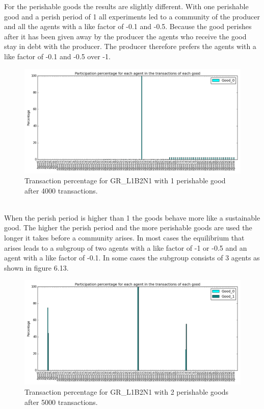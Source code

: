 \documentclass[twoside,openright]{uva-bachelor-thesis}
\begin{document}
For the perishable goods the results are slightly different. With one perishable good and a perish period of 1 all experiments led to a community of the producer and all the agents with a like factor of -0.1 and -0.5. Because the good perishes after it has been given away by the producer the agents who receive the good stay in debt with the producer. The producer therefore prefers the agents with a like factor of -0.1 and -0.5 over -1. \\
\begin{figure}[h!]
  \centering
  \includegraphics[scale=0.4]{Simulation2_figures/GR_L1B2N1/Figure5_1perishable_4k}
  \caption{Transaction percentage for GR\_L1B2N1 with 1 perishable good after 4000 transactions.}
\end{figure}
 \\
When the perish period is higher than 1 the goods behave more like a sustainable good. The higher the perish period and the more perishable goods are used the longer it takes before a community arises. In most cases the equilibrium that arises leads to a subgroup of two agents with a like factor of -1 or -0.5 and an agent with a like factor of -0.1. In some cases the subgroup consists of 3 agents as shown in figure 6.13.\\
\begin{figure}[h!]
  \centering
 \includegraphics[scale=0.4]{Simulation2_figures/GR_L1B2N1/Figure6_2perishable_5k} 
  \caption{Transaction percentage for GR\_L1B2N1 with 2 perishable goods after 5000 transactions.}
\end{figure}
\end{document}
